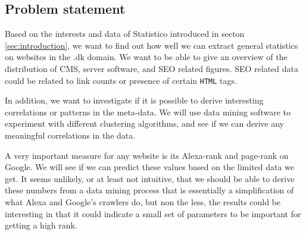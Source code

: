 
\subsection{Problem statement}
\label{subsec:problem_statement}
Based on the interests and data of Statistico introduced in secton \ref{sec:introduction}, we want to find out how well we can extract general statistics on websites in the .dk domain. We want to be able to give an overview of the distribution of CMS, server software, and SEO related figures. SEO related data could be related to link counts or presence of certain \texttt{HTML} tags.

In addition, we want to investigate if it is possible to derive interesting correlations or patterns in the meta-data. We will use data mining software to experiment with different clustering algorithms, and see if we can derive any meaningful correlations in the data.

A very important measure for any website is its Alexa-rank and page-rank on Google. We will see if we can predict these values based on the limited data we get. It seems unlikely, or at least not intuitive, that we should be able to derive these numbers from a data mining process that is essentially a simplification of what Alexa and Google's crawlers do, but non the less, the results could be interesting in that it could indicate a small set of parameters to be important for getting a high rank.


